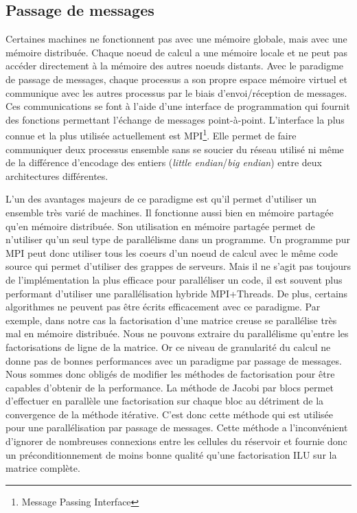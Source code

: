 \subsection{Passage de messages}
Certaines machines ne fonctionnent pas avec une mémoire globale, mais avec une mémoire distribuée.
% 
Chaque noeud de calcul a une mémoire locale et ne peut pas accéder directement à la mémoire des autres noeuds distants.
%
Avec le paradigme de passage de messages, chaque processus a son propre espace mémoire virtuel et communique avec les autres processus par le biais d'envoi/réception de messages.
%
Ces communications se font à l'aide d'une interface de programmation qui fournit des fonctions permettant l'échange de messages point-à-point.
%
L'interface la plus connue et la plus utilisée actuellement est MPI\footnote{Message Passing Interface}.
%
Elle permet de faire communiquer deux processus ensemble sans se soucier du réseau utilisé ni même de la différence d'encodage des entiers ({\em little endian}/{\em big endian}) entre deux architectures différentes.

L'un des avantages majeurs de ce paradigme est qu'il permet d'utiliser un ensemble très varié de machines.
%
Il fonctionne aussi bien en mémoire partagée qu'en mémoire distribuée.
%
Son utilisation en mémoire partagée permet de n'utiliser qu'un seul type de parallélisme dans un programme.
%
Un programme pur MPI peut donc utiliser tous les coeurs d'un noeud de calcul avec le même code source qui permet d'utiliser des grappes de serveurs.
%
Mais il ne s'agit pas toujours de l'implémentation la plus efficace pour paralléliser un code, il est souvent plus performant d'utiliser une parallélisation hybride MPI+Threads\cite{mpi_openmp}.
%
De plus, certains algorithmes ne peuvent pas être écrits efficacement avec ce paradigme.
%
Par exemple, dans notre cas la factorisation d'une matrice creuse se parallélise très mal en mémoire distribuée.
%
Nous ne pouvons extraire du parallélisme qu'entre les factorisations de ligne de la matrice.
%
Or ce niveau de granularité du calcul ne donne pas de bonnes performances avec un paradigme par passage de messages.
%
Nous sommes donc obligés de modifier les méthodes de factorisation pour être capables d'obtenir de la performance.
%
La méthode de Jacobi par blocs permet d'effectuer en parallèle une factorisation sur chaque bloc au détriment de la convergence de la méthode itérative.
%
C'est donc cette méthode qui est utilisée pour une parallélisation par passage de messages.
%
Cette méthode a l'inconvénient d'ignorer de nombreuses connexions entre les cellules du réservoir et fournie donc un préconditionnement de moins bonne qualité qu'une factorisation ILU sur la matrice complète.
